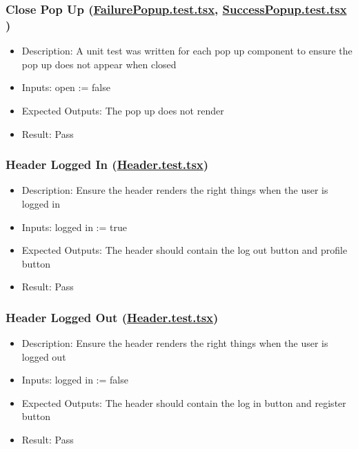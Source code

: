 \documentclass[12pt, titlepage]{article}
\begin{document}
\subsubsection{Close Pop Up (\href{https://github.com/OKKM-insights/frontend/blob/main/tests/__tests__/FailurePopup.test.tsx}{FailurePopup.test.tsx}, \href{https://github.com/OKKM-insights/frontend/blob/main/tests/__tests__/SuccessPopup.test.tsx}{SuccessPopup.test.tsx} )}
\begin{itemize}
    \item Description: A unit test was written for each pop up component to ensure the pop up does not appear when closed
    \item Inputs: open := false
    \item Expected Outputs: The pop up does not render 
    \item Result: Pass
\end{itemize}
\subsubsection{Header Logged In (\href{https://github.com/OKKM-insights/frontend/blob/main/tests/__tests__/Header.test.tsx}{Header.test.tsx})}
\begin{itemize}
    \item Description: Ensure the header renders the right things when the user is logged in
    \item Inputs: logged in := true
    \item Expected Outputs: The header should contain the log out button and profile button
    \item Result: Pass
\end{itemize}
\subsubsection{Header Logged Out (\href{https://github.com/OKKM-insights/frontend/blob/main/tests/__tests__/Header.test.tsx}{Header.test.tsx})}
\begin{itemize}
    \item Description: Ensure the header renders the right things when the user is logged out
    \item Inputs: logged in := false
    \item Expected Outputs: The header should contain the log in button and register button
    \item Result: Pass
\end{itemize}
\end{document}
